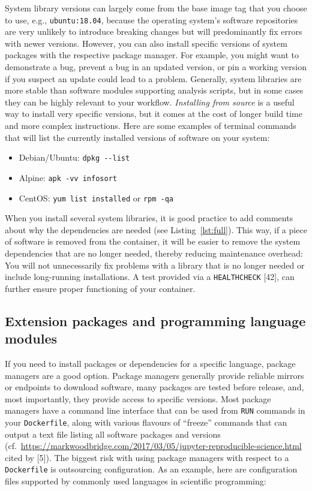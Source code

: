 \documentclass[10pt,letterpaper]{article}
\providecommand{\tightlist}{%
  \setlength{\itemsep}{0pt}\setlength{\parskip}{0pt}}
\begin{document}
System library versions can largely come from the base image tag that
you choose to use, e.g., \texttt{ubuntu:18.04}, because the operating
system's software repositories are very unlikely to introduce breaking
changes but will predominantly fix errors with newer versions. However,
you can also install specific versions of system packages with the
respective package manager. For example, you might want to demonstrate a
bug, prevent a bug in an updated version, or pin a working version if
you suspect an update could lead to a problem. Generally, system
libraries are more stable than software modules supporting analysis
scripts, but in some cases they can be highly relevant to your workflow.
\emph{Installing from source} is a useful way to install very specific
versions, but it comes at the cost of longer build time and more complex
instructions. Here are some examples of terminal commands that will list
the currently installed versions of software on your system:

\begin{itemize}
\tightlist
\item
  Debian/Ubuntu: \texttt{dpkg\ -\/-list}
\item
  Alpine: \texttt{apk\ -vv\ info\textbar{}sort}
\item
  CentOS: \texttt{yum\ list\ installed} or \texttt{rpm\ -qa}
\end{itemize}

When you install several system libraries, it is good practice to add
comments about why the dependencies are needed (see
Listing~\ref{lst:full}). This way, if a piece of software is removed
from the container, it will be easier to remove the system dependencies
that are no longer needed, thereby reducing maintenance overhead: You
will not unnecessarily fix problems with a library that is no longer
needed or include long-running installations. A test provided via a
\texttt{HEALTHCHECK} {[}42{]}, can further ensure proper functioning of
your container.

\hypertarget{extension-packages-and-programming-language-modules}{%
\subsection{Extension packages and programming language
modules}\label{extension-packages-and-programming-language-modules}}

If you need to install packages or dependencies for a specific language,
package managers are a good option. Package managers generally provide
reliable mirrors or endpoints to download software, many packages are
tested before release, and, most importantly, they provide access to
specific versions. Most package managers have a command line interface
that can be used from \texttt{RUN} commands in your \texttt{Dockerfile},
along with various flavours of ``freeze'' commands that can output a
text file listing all software packages and versions
(cf.~\url{https://markwoodbridge.com/2017/03/05/jupyter-reproducible-science.html}
cited by {[}5{]}). The biggest risk with using package managers with
respect to a \texttt{Dockerfile} is outsourcing configuration. As an
example, here are configuration files supported by commonly used
languages in scientific programming:
\end{document}
